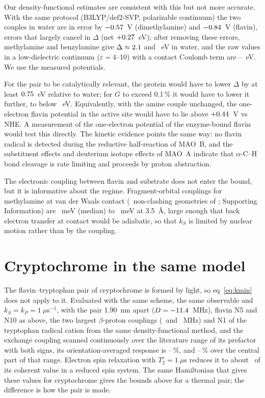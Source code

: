 \documentclass[journal=jpcbfk,manuscript=article,layout=traditional]{achemso}
\begin{document}
Our density-functional estimates are consistent with this but not more
accurate. With the same protocol (B3LYP/def2-SVP, polarizable continuum) the
two couples in water are in error by $-0.57$~V (dimethylamine) and $-0.84$~V
(flavin), errors that largely cancel in $\Delta$ (net $+0.27$~eV); after removing
these errors, methylamine and benzylamine give $\Delta\approx2.1$
and \DeltaCorrBenzyl~eV in water, and the raw values in a low-dielectric
continuum ($\varepsilon = 4$--10) with a contact Coulomb term are
\DeltaDFTmin--\DeltaDFTmax~eV. We use the measured potentials.

For the pair to be catalytically relevant, the protein would have to lower
$\Delta$ by at least $0.75$~eV relative to water; for $G$ to exceed 0.1\,\%
it would have to lower it further, to below \DeltaTenthOneEnv~eV. Equivalently,
with the amine couple unchanged, the one-electron flavin potential in the
active site would have to lie above $+0.44$~V vs NHE. A measurement of the
one-electron potential of the enzyme-bound flavin would test this directly.
The kinetic evidence points the same way: no flavin radical is detected during
the reductive half-reaction of MAO~B,\cite{Walker1994} and the substituent
effects and deuterium isotope effects of MAO~A indicate that $\alpha$-C--H bond
cleavage is rate limiting and proceeds by proton abstraction.\cite{Miller1999}

The electronic coupling between flavin and substrate does not enter the bound,
but it is informative about the regime. Fragment-orbital couplings for
methylamine at van der Waals contact (\nScanValid\ non-clashing geometries of
\nScan; Supporting Information) are \tContactMed~meV (median) to
\tContactMax~meV at 3.5~\AA, large enough that back electron transfer at contact
would be adiabatic, so that $k_S$ is limited by nuclear motion rather than by
the coupling.

\section{Cryptochrome in the same model}

The flavin--tryptophan pair of cryptochrome is formed by light, so
eq~\ref{eq:kmin} does not apply to it. Evaluated with the same scheme, the same
observable and $k_S = k_P = 1~\mu$s$^{-1}$, with the pair 1.90~nm apart
($D = -11.4$~MHz), flavin N5 and N10 as above, the two largest
$\beta$-proton couplings (\aTrpOne\ and \aTrpTwo~MHz) and N1 of the tryptophan
radical cation from the same density-functional method, and the exchange
coupling scanned continuously over the literature range of its prefactor with
both signs,\cite{Efimova2008} its orientation-averaged response is
\cryMin--\cryMax\,\%, and \cryMidMin--\cryMidMax\,\% over the central part of
that range. Electron spin relaxation with $T_2^e = 1~\mu$s\cite{Kattnig2016}
reduces it to about \cryTtwoRatio\ of its coherent value in a reduced spin system. The
same Hamiltonian that gives these values for cryptochrome gives the bounds
above for a thermal pair; the difference is how the pair is made.
\end{document}
